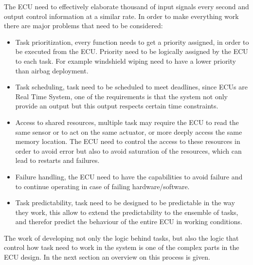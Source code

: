 \documentclass[../main.tex]{subfiles}
\begin{document}
The \gls{ECU} need to effectively elaborate thousand of input signals every second and output control information at a similar rate. In order to make everything work there are major problems that need to be considered:
\begin{itemize}
    \item Task prioritization, every function needs to get a priority assigned, in order to be executed from the \gls{ECU}. Priority need to be logically assigned by the \gls{ECU} to each task. For example windshield wiping need to have a lower priority than airbag deployment. 
    \item Task scheduling, task need to be scheduled to meet deadlines, since \gls{ECU}s are Real Time System, one of the requirements is that the system not only provide an output but this output respects certain time constraints.
    \item Access to shared resources, multiple task may require the \gls{ECU} to read the same sensor or to act on the same actuator, or more deeply access the same memory location. The \gls{ECU} need to control the access to these resources in order to avoid error but also to avoid saturation of the resources, which can lead to restarts and failures.  
    \item Failure handling, the \gls{ECU} need to have the capabilities to avoid failure and to continue operating in case of failing hardware/software.
    \item Task predictability, task need to be designed to be predictable in the way they work, this allow to extend the predictability to the ensemble of tasks, and therefor predict the behaviour of the entire \gls{ECU} in working conditions. 
\end{itemize}
The work of developing not only the logic behind tasks, but also the logic that control how task need to work in the system is one of the complex parts in the \gls{ECU} design. In the next section an overview on this process is given. 
\end{document}
